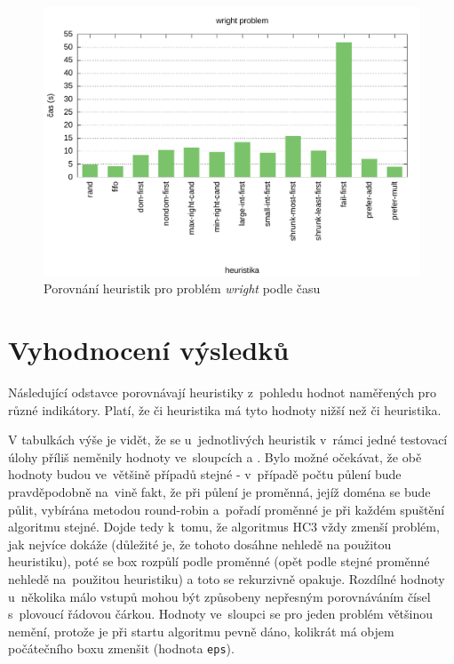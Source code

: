 {\begin{figure}[H]
\centering
\includegraphics[scale=0.68]{chart/wright_time.pdf}
\caption{Porovnání heuristik pro problém \emph{wright} podle času}
\end{figure}


\section{Vyhodnocení výsledků}
Následující odstavce porovnávají heuristiky z~pohledu hodnot naměřených pro různé indikátory. Platí, že  či  heuristika má tyto hodnoty nižší než  či  heuristika.

V tabulkách výše je vidět, že se u~jednotlivých heuristik v~rámci jedné testovací úlohy příliš neměnily hodnoty ve~sloupcích  a . Bylo možné očekávat, že obě hodnoty budou ve~většině případů stejné - v~případě počtu půlení bude pravděpodobně na~vině fakt, že při půlení je proměnná, jejíž doména se bude půlit, vybírána metodou round-robin a~pořadí proměnné je při každém spuštění algoritmu stejné. Dojde tedy k~tomu, že algoritmus HC3 vždy zmenší problém, jak nejvíce dokáže (důležité je, že tohoto dosáhne nehledě na použitou heuristiku), poté se box rozpůlí podle proměnné (opět podle stejné proměnné nehledě na~použitou heuristiku) a toto se rekurzivně opakuje. Rozdílné hodnoty u~několika málo vstupů mohou být způsobeny nepřesným porovnáváním čísel s~plovoucí řádovou čárkou. Hodnoty ve~sloupci  se pro jeden problém většinou nemění, protože je při startu algoritmu pevně dáno, kolikrát má objem počátečního boxu zmenšit (hodnota \verb|eps|).

}

